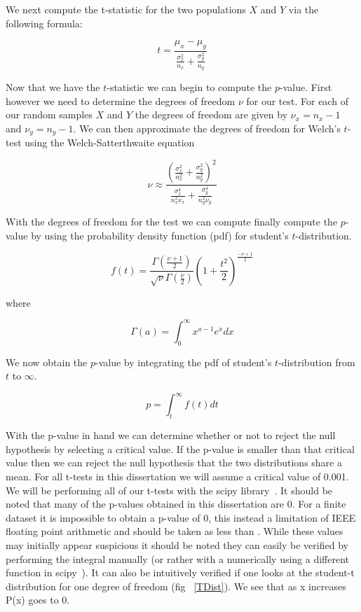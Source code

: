 We next compute the t-statistic for the two populations $X$ and $Y$ via the following formula:

	 \begin{equation}\label{t-stat}
		t = \frac{  \mu_x - \mu_y }{ \frac{\sigma_{x}^2}{n_x} + \frac{\sigma_{y}^2}{n_y}   }
	 \end{equation}

Now that we have the $t$-statistic we can begin to compute the $p$-value. First however we need to determine the degrees of freedom $\nu$ for our test. For each of our random samples $X$ and $Y$ the degrees of freedom are given by $\nu_x = n_x -1$ and $\nu_y = n_y-1$. We can then approximate the degrees of freedom for Welch's $t$-test using the Welch-Satterthwaite equation ~\cite{satterthwaite1946approximate,welch_generalization_1947}

	\begin{equation}\label{tTestDegrees}
		\nu \approx \frac{ (\frac{\sigma_{x}^2}{n_{x}^2}+\frac{\sigma_{y}^2}{n_{y}^2})^2 }{\frac{\sigma_{x}^4}{n_{x}^2 \nu_x}+\frac{\sigma_{y}^4}{n_{y}^2 \nu_y}}
	\end{equation}

With the degrees of freedom for the test we can compute finally compute the $p$-value by using the probability density function (pdf) for student's $t$-distribution. 

\begin{equation}\label{tTestPDF}
	f(t)=\frac{\Gamma(\frac{\nu+1}{2})}{\sqrt{\nu}\Gamma(\frac{\nu}{2})}(1+\frac{t^2}{2})^{\frac{-\nu+1}{2}}
\end{equation}

where 

\begin{equation}\label{Gamma}
	\Gamma(a) = \int_{0}^{\infty} x^{a-1}e^{x}dx
\end{equation}

We now obtain the $p$-value by integrating the pdf of student's $t$-distribution from $t$ to $\infty$. 

\begin{equation}\label{pvalStudentTest}
	p=\int_{t}^{\infty}f(t)dt 
\end{equation}

With the p-value in hand we can determine whether or not to reject the null hypothesis by selecting a critical value. If the p-value is smaller than that critical value then we can reject the null hypothesis that the two distributions share a mean.  For all t-tests in this dissertation we will assume a critical value of 0.001. We will be performing all of our t-tests with the scipy library~\cite{jones_scipy:_2001}. It should be noted that many of the p-values obtained in this dissertation are 0. For a finite dataset it is impossible to obtain a p-value of 0, this instead a limitation of IEEE floating point arithmetic and should be taken as less than  . While these values may initially appear suspicious it should be noted they can easily be verified by performing the integral manually (or rather with a numerically using a different function in scipy~\cite{jones_scipy:_2001}).  It can also be intuitively verified if one looks at the student-t distribution for one degree of freedom (fig ~\ref{TDist}).  We see that as x increases P(x) goes to 0.  

